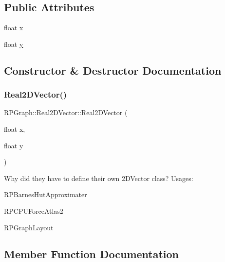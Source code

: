 \subsection*{Public Attributes}
\begin{DoxyCompactItemize}
\item 
float \mbox{\hyperlink{classRPGraph_1_1Real2DVector_a4511632e71344b88deee5512b791e97d}{x}}
\item 
float \mbox{\hyperlink{classRPGraph_1_1Real2DVector_aa37f96dfb13727fdee7a82ddbd1d7f60}{y}}
\end{DoxyCompactItemize}


\subsection{Constructor \& Destructor Documentation}
\mbox{\label{classRPGraph_1_1Real2DVector_af6c81ec0d227c6cd31047e436bf574d5}} 
\subsubsection{\texorpdfstring{Real2\+D\+Vector()}{Real2DVector()}}
{\footnotesize\ttfamily R\+P\+Graph\+::\+Real2\+D\+Vector\+::\+Real2\+D\+Vector (\begin{DoxyParamCaption}\item[{float}]{x,  }\item[{float}]{y }\end{DoxyParamCaption})}

Why did they have to define their own 2\+D\+Vector class? Usages\+:
\begin{DoxyItemize}
\item R\+P\+Barnes\+Hut\+Approximater
\item R\+P\+C\+P\+U\+Force\+Atlas2
\item R\+P\+Graph\+Layout 
\end{DoxyItemize}

\subsection{Member Function Documentation}
\mbox{\label{classRPGraph_1_1Real2DVector_ac4f84d862727a3e3c8d31785c8e6a098}} 
